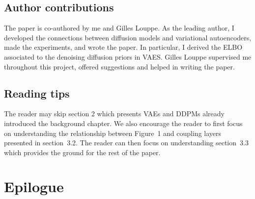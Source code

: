 \subsection{Author contributions}
The paper is co-authored by me and Gilles Louppe. As the leading author, I developed the connections between diffusion models and variational autoencoders, made the experiments, and wrote the paper. In particular, I derived the ELBO associated to the denoising diffusion priors in VAES. Gilles Louppe supervised me throughout this project, offered suggestions and helped in writing the paper.

\subsection{Reading tips}
The reader may skip section 2 which presents VAEs and DDPMs already introduced the background chapter. We also encourage the reader to first focus on understanding the relationship between Figure~1 and coupling layers presented in section~3.2. The reader can then focus on understanding section~3.3 which provides the ground for the rest of the paper.




\section{Epilogue}
